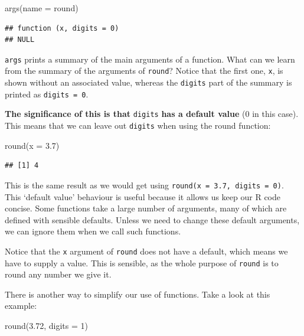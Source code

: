 \documentclass[
]{book}
\newenvironment{Shaded}{\begin{snugshade}}{\end{snugshade}}
\newcommand{\AttributeTok}[1]{\textcolor[rgb]{0.77,0.63,0.00}{#1}}
\newcommand{\DecValTok}[1]{\textcolor[rgb]{0.00,0.00,0.81}{#1}}
\newcommand{\FloatTok}[1]{\textcolor[rgb]{0.00,0.00,0.81}{#1}}
\newcommand{\FunctionTok}[1]{\textcolor[rgb]{0.00,0.00,0.00}{#1}}
\newcommand{\NormalTok}[1]{#1}
\begin{document}
\begin{Shaded}
\begin{Highlighting}[]
\FunctionTok{args}\NormalTok{(}\AttributeTok{name =}\NormalTok{ round)}
\end{Highlighting}
\end{Shaded}

\begin{verbatim}
## function (x, digits = 0) 
## NULL
\end{verbatim}

\texttt{args} prints a summary of the main arguments of a function. What can we learn from the summary of the arguments of \texttt{round}? Notice that the first one, \texttt{x}, is shown without an associated value, whereas the \texttt{digits} part of the summary is printed as \texttt{digits\ =\ 0}.

\textbf{The significance of this is that} \texttt{digits} \textbf{has a default value} (0 in this case). This means that we can leave out \texttt{digits} when using the round function:

\begin{Shaded}
\begin{Highlighting}[]
\FunctionTok{round}\NormalTok{(}\AttributeTok{x =} \FloatTok{3.7}\NormalTok{)}
\end{Highlighting}
\end{Shaded}

\begin{verbatim}
## [1] 4
\end{verbatim}

This is the same result as we would get using \texttt{round(x\ =\ 3.7,\ digits\ =\ 0)}. This `default value' behaviour is useful because it allows us keep our R code concise. Some functions take a large number of arguments, many of which are defined with sensible defaults. Unless we need to change these default arguments, we can ignore them when we call such functions.

Notice that the \texttt{x} argument of \texttt{round} does not have a default, which means we have to supply a value. This is sensible, as the whole purpose of \texttt{round} is to round any number we give it.

There is another way to simplify our use of functions. Take a look at this example:

\begin{Shaded}
\begin{Highlighting}[]
\FunctionTok{round}\NormalTok{(}\FloatTok{3.72}\NormalTok{, }\AttributeTok{digits =} \DecValTok{1}\NormalTok{)}
\end{Highlighting}
\end{Shaded}
\end{document}
